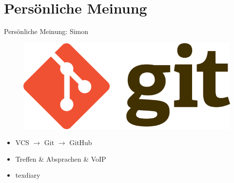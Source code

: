 \documentclass[aspectratio=169]{beamer}
\begin{document}
\section{Persönliche Meinung}
\begin{frame}[plain]{Persönliche Meinung: Simon}
    \begin{varwidth}{.4\textwidth}
        \begin{figure}
            \centering
            \includegraphics[width=.95\textwidth]{media/git-logo.png}
        \end{figure}
    \end{varwidth}
    \hfill
    \begin{varwidth}{.5\textwidth}
        \begin{itemize}\pause
            \item VCS $\rightarrow$ Git $\rightarrow$ GitHub\pause
            \item Treffen \& Absprachen \& VoIP\pause
            \item texdiary
        \end{itemize}
    \end{varwidth}
\end{frame}
\end{document}
